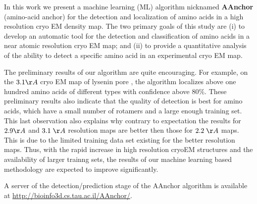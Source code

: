 In this work we present a machine learning (ML) algorithm nicknamed {\bf AAnchor} (amino-acid anchor) for the detection and localization of amino acids in a high resolution cryo EM density map. 
The two primary goals of this study are 
(i) to develop an automatic tool for the detection and classification of amino acids in a near atomic resolution cryo EM map; and 
(ii) to provide a quantitative analysis of the ability to detect a specific amino acid in an experimental cryo EM map.


The preliminary results of our algorithm are quite encouraging.
For example, on the $3.1 \AA$ cryo EM map of lysenin pore \cite{Bokori-Brown2016}, the algorithm localizes above one hundred amino acids of different types with confidence above $80 \%$.
These preliminary results also indicate that the quality of detection is best for amino acids, which have a small number of rotamers and a large enough training set.  This last observation also explains why
contrary to expectation the results for  $2.9  \AA$ and $3.1 \;\AA$ resolution maps are better then those for $2.2 \;\AA$ maps. This is due to the limited training data set existing for the better resolution maps.  Thus, with the rapid increase in high resolution cryoEM structures and the availability of larger trainng sets, the results of our machine learning based methodology are expected to improve significantly.

A server of the detection/prediction stage of the  AAnchor algorithm is available at \url{http://bioinfo3d.cs.tau.ac.il/AAnchor/}.  










